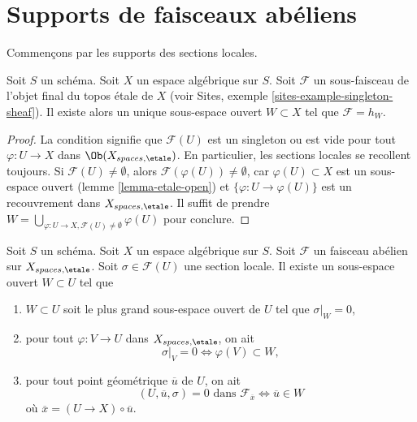 \section{Supports de faisceaux abéliens}
\label{section-support}

\noindent
Commençons par les supports des sections locales.

\begin{lemma}
\label{lemma-support-subsheaf-final}
Soit $S$ un schéma. Soit $X$ un espace algébrique sur $S$.
Soit $\mathcal{F}$ un sous-faisceau de l'objet final du topos \'etale
de $X$ (voir
Sites, exemple \ref{sites-example-singleton-sheaf}).
Il existe alors un unique sous-espace ouvert
$W \subset X$ tel que $\mathcal{F} = h_W$.
\end{lemma}

\begin{proof}
La condition signifie que $\mathcal{F}(U)$ est un singleton ou
est vide pour tout $\varphi : U \to X$ dans $\Ob(X_{spaces, \etale})$.
En particulier, les sections locales se recollent toujours. Si
$\mathcal{F}(U) \not = \emptyset$, alors
$\mathcal{F}(\varphi(U)) \not = \emptyset$, car
$\varphi(U) \subset X$ est un sous-espace ouvert
(lemme \ref{lemma-etale-open})
et
$\{\varphi : U \to \varphi(U)\}$ est un recouvrement dans $X_{spaces, \etale}$.
Il suffit de prendre
$W = \bigcup_{\varphi : U \to X, \mathcal{F}(U) \not = \emptyset} \varphi(U)$
pour conclure.
\end{proof}

\begin{lemma}
\label{lemma-zero-over-image}
Soit $S$ un schéma.
Soit $X$ un espace algébrique sur $S$.
Soit $\mathcal{F}$ un faisceau abélien sur $X_{spaces, \etale}$.
Soit $\sigma \in \mathcal{F}(U)$ une section locale.
Il existe un sous-espace ouvert $W \subset U$ tel que
\begin{enumerate}
\item $W \subset U$ soit le plus grand sous-espace ouvert de $U$
tel que $\sigma|_W = 0$,
\item pour tout $\varphi : V \to U$ dans $X_{spaces, \etale}$, on ait
$$
\sigma|_V = 0 \Leftrightarrow \varphi(V) \subset W,
$$
\item pour tout point géométrique $\overline{u}$ de $U$, on ait
$$
(U, \overline{u}, \sigma) = 0\text{ dans }\mathcal{F}_{\overline{x}}
\Leftrightarrow
\overline{u} \in W
$$
où $\overline{x} = (U \to X) \circ \overline{u}$.
\end{enumerate}
\end{lemma}

